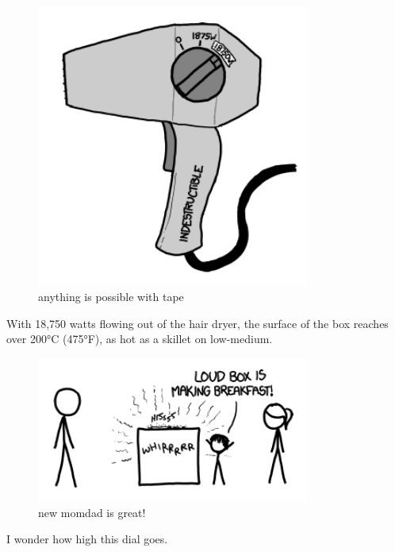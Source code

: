 \begin{figure}[!htbp]
\centering
\includegraphics[scale=0.5, max width=0.8\textwidth]{imgs/a/35/hair_dryer_18750.png}
\caption{anything is possible with tape}
\end{figure}

{With 18,750 watts flowing out of the hair dryer, the surface of the box reaches over 200°C (475°F), as hot as a skillet on low-medium.}

\begin{figure}[!htbp]
\centering
\includegraphics[scale=0.5, max width=0.8\textwidth]{imgs/a/35/hair_dryer_breakfast.png}
\caption{new momdad is great!}
\end{figure}

{I wonder how high this dial goes.}


